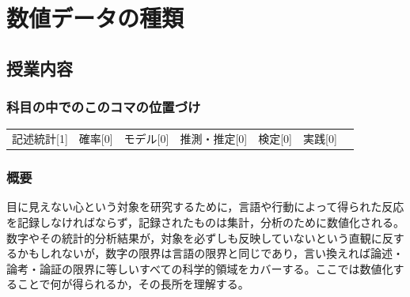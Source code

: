 \section{数値データの種類}
\label{s02_Numbers}

\subsection{授業内容}
\subsubsection{科目の中でのこのコマの位置づけ}
\begin{tabular}[t]{ccccccc}
	記述統計[1] & 確率[0] & モデル[0] & 推測・推定[0] & 検定[0] & 実践[0]
\end{tabular}
\subsubsection{概要}
目に見えない心という対象を研究するために，言語や行動によって得られた反応を記録しなければならず，記録されたものは集計，分析のために数値化される。数字やその統計的分析結果が，対象を必ずしも反映していないという直観に反するかもしれないが，数字の限界は言語の限界と同じであり，言い換えれば論述・論考・論証の限界に等しいすべての科学的領域をカバーする。ここでは数値化することで何が得られるか，その長所を理解する。
